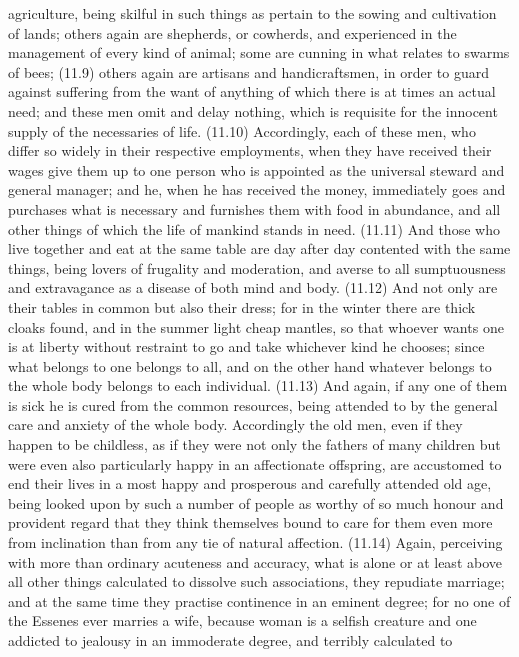 agriculture, being skilful in such things as pertain to the sowing and cultivation of lands; others again
are shepherds, or cowherds, and experienced in the management of every kind of animal; some are
cunning in what relates to swarms of bees; (11.9) others again are artisans and handicraftsmen, in
order to guard against suffering from the want of anything of which there is at times an actual need;
and these men omit and delay nothing, which is requisite for the innocent supply of the necessaries of
life. (11.10) Accordingly, each of these men, who differ so widely in their respective employments, when
they have received their wages give them up to one person who is appointed as the universal steward
and general manager; and he, when he has received the money, immediately goes and purchases what is
necessary and furnishes them with food in abundance, and all other things of which the life of mankind
stands in need. (11.11) And those who live together and eat at the same table are day after day
contented with the same things, being lovers of frugality and moderation, and averse to all
sumptuousness and extravagance as a disease of both mind and body. (11.12) And not only are their
tables in common but also their dress; for in the winter there are thick cloaks found, and in the summer
light cheap mantles, so that whoever wants one is at liberty without restraint to go and take whichever
kind he chooses; since what belongs to one belongs to all, and on the other hand whatever belongs to
the whole body belongs to each individual. (11.13) And again, if any one of them is sick he is cured from
the common resources, being attended to by the general care and anxiety of the whole body.
Accordingly the old men, even if they happen to be childless, as if they were not only the fathers of many
children but were even also particularly happy in an affectionate offspring, are accustomed to end their
lives in a most happy and prosperous and carefully attended old age, being looked upon by such a
number of people as worthy of so much honour and provident regard that they think themselves bound
to care for them even more from inclination than from any tie of natural affection. (11.14) Again,
perceiving with more than ordinary acuteness and accuracy, what is alone or at least above all other
things calculated to dissolve such associations, they repudiate marriage; and at the same time they
practise continence in an eminent degree; for no one of the Essenes ever marries a wife, because woman
is a selfish creature and one addicted to jealousy in an immoderate degree, and terribly calculated to
